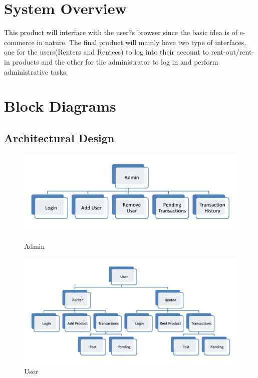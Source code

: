 \documentclass[11pt]{report}
\begin{document}
\section{System Overview}
This product will interface with the user?s browser since the basic idea is of e-commerce in nature. The final product will mainly have two type of interfaces, one for the users(Renters and Rentees) to log into their account to rent-out/rent-in products and the other for the administrator to log in and perform administrative tasks.
\vspace{5in}
\section{Block Diagrams} 
\subsection{Architectural Design}
\begin{figure}[h]
  \centering
    \includegraphics[width=6in]{block1.jpg} 
	\caption{Admin}
  \centering
    \includegraphics[width=6in]{block2.jpg} 
	\caption{User}
\end{figure}
\end{document}
